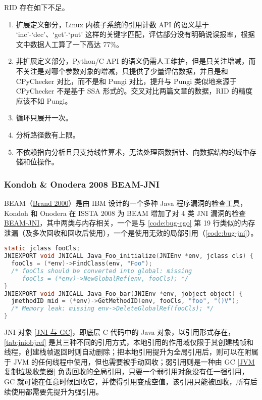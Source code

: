 RID 存在如下不足。

\begin{enumerate}
\item 扩展定义部分，Linux 内核子系统的引用计数 API 的语义基于 `inc'-`dec'、`get'-`put' 这样的关键字匹配，评估部分没有明确说误报率，根据文中数据人工算了一下高达 77\%。
\item 非扩展定义部分，Python/C API 的语义仍需人工维护，但是只关注增减，而不关注是对哪个参数对象的增减，只提供了少量评估数据，并且是和 CPyChecker 对比，而不是和 Pungi 对比，提升与 Pungi 类似地来源于 CPyChecker 不是基于 SSA 形式的。交叉对比两篇文章的数据，RID 的精度应该不如 Pungi。
\item 循环只展开一次。
\item 分析路径数有上限。
\item 不依赖指向分析且只支持线性算术，无法处理函数指针、向数据结构的域中存储和位操作。
\end{enumerate}

\subsubsection{Kondoh \& Onodera 2008 BEAM-JNI}

BEAM（\href{https://ieeexplore.ieee.org/document/885870}{Brand 2000}）是由 IBM 设计的一个多种 Java 程序漏洞的检查工具，Kondoh 和 Onodera 在 ISSTA 2008 为 BEAM 增加了对 4 类 JNI 漏洞的检查 \href{https://dl.acm.org/doi/10.1145/1390630.1390645}{BEAM-JNI}，其中两类与内存相关，一个是与 \autoref{code:bug-cgo} 第 19 行类似的内存泄漏（及多次回收和回收后使用），一个是使用无效的局部引用（\autoref{code:bug-jni}）。

\begin{lstfloat}
\begin{lstlisting}[language={C},caption={错误的 JNI 程序},label={code:bug-jni}]
static jclass fooCls;
JNIEXPORT void JNICALL Java_Foo_initialize(JNIEnv *env, jclass cls) {
  fooCls = (*env)->FindClass(env, "Foo");
  /* fooCls should be converted into global: missing
     fooCls = (*env)->NewGlobalRef(env, fooCls); */
}
JNIEXPORT void JNICALL Java_Foo_bar(JNIEnv *env, jobject object) {
  jmethodID mid = (*env)->GetMethodID(env, fooCls, "foo", "()V");
  /* Memory leak: missing env->DeleteGlobalRef(fooCls); */
}
\end{lstlisting}
\end{lstfloat}

JNI 对象 [\href{https://www.ibm.com/docs/en/sdk-java-technology/8?topic=jni-garbage-collector}{JNI 与 GC}]，即底层 C 代码中的 Java 对象，以引用形式存在，\autoref{tab:jniobjref} 是其三种不同的引用方式，本地引用的作用域仅限于其创建栈帧和线程，创建栈帧返回时则自动删除；把本地引用提升为全局引用后，则可以在附属于 JVM 的任何线程中使用，但也需要被手动回收；弱引用则是一种由 GC [\href{https://stackoverflow.com/questions/9465767/if-the-jvm-keeps-moving-objects-around-when-it-does-gc-how-does-it-resolve-refe}{JVM 复制垃圾收集器}] 负责回收的全局引用，只要一个弱引用对象没有任一强引用，GC 就可能在任意时候回收它，并使得引用变成空值，该引用只能被回收，所有后续使用都需要先提升为强引用。


